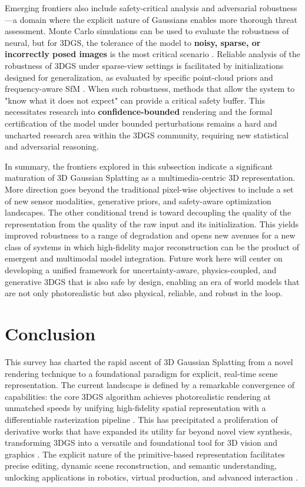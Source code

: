 \documentclass[11pt,a4paper]{article}
\begin{document}
Emerging frontiers also include safety-critical analysis and adversarial robustness---a domain where the explicit nature of Gaussians enables more thorough threat assessment. Monte Carlo simulations can be used to evaluate the robustness of neural, but for 3DGS, the tolerance of the model to \textbf{noisy, sparse, or incorrectly posed images} is the most critical scenario \cite{arxiv:2504.09129v1}. Reliable analysis of the robustness of 3DGS under sparse-view settings is facilitated by initializations designed for generalization, as evaluated by specific point-cloud priors and frequency-aware SfM \cite{arxiv:2510.17479v1}. When such robustness, methods that allow the system to "know what it does not expect" can provide a critical safety buffer. This necessitates research into \textbf{confidence-bounded} rendering and the formal certification of the model under bounded perturbations remains a hard and uncharted research area within the 3DGS community, requiring new statistical and adversarial reasoning.

In summary, the frontiers explored in this subsection indicate a significant maturation of 3D Gaussian Splatting as a multimedia-centric 3D representation. More direction goes beyond the traditional pixel-wise objectives to include a set of new sensor modalities, generative priors, and safety-aware optimization landscapes. The other conditional trend is toward decoupling the quality of the representation from the quality of the raw input and its initialization. This yields improved robustness to a range of degradation and opens new avenues for a new class of systems in which high-fidelity major reconstruction can be the product of emergent and multimodal model integration. Future work here will center on developing a unified framework for uncertainty-aware, physics-coupled, and generative 3DGS that is also safe by design, enabling an era of world models that are not only photorealistic but also physical, reliable, and robust in the loop.


\section{Conclusion}


This survey has charted the rapid ascent of 3D Gaussian Splatting from a novel rendering technique to a foundational paradigm for explicit, real-time scene representation. The current landscape is defined by a remarkable convergence of capabilities: the core 3DGS algorithm achieves photorealistic rendering at unmatched speeds by unifying high-fidelity spatial representation with a differentiable rasterization pipeline \cite{arxiv:2407.17418v1}. This has precipitated a proliferation of derivative works that have expanded its utility far beyond novel view synthesis, transforming 3DGS into a versatile and foundational tool for 3D vision and graphics \cite{arxiv:2510.26694v1}. The explicit nature of the primitive-based representation facilitates precise editing, dynamic scene reconstruction, and semantic understanding, unlocking applications in robotics, virtual production, and advanced interaction \cite{arxiv:2403.11134v2,arxiv:2401.03890v2,arxiv:2508.09977v5}.
\end{document}
